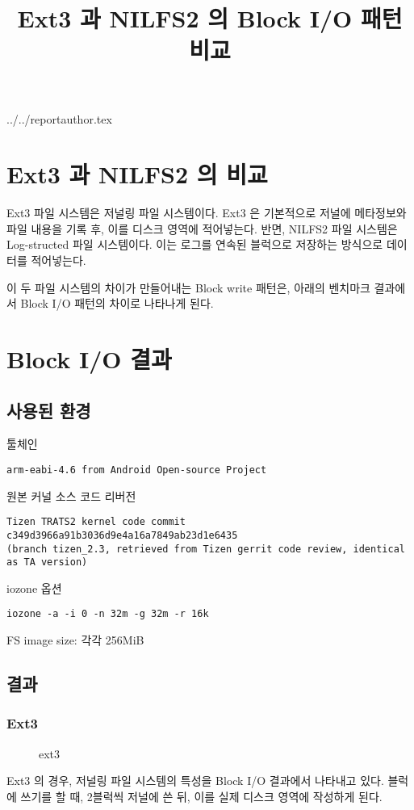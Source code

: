 \documentclass {article}
\begin{document}
\title {Ext3 과 NILFS2 의 Block I/O 패턴 비교}
 {../../reportauthor.tex}
\maketitle

\section{Ext3 과 NILFS2 의 비교}
Ext3 파일 시스템은 저널링 파일 시스템이다. Ext3 은 기본적으로 저널에 메타정보와 파일 내용을 기록 후, 이를 디스크 영역에 적어넣는다. 반면,
NILFS2 파일 시스템은 Log-structed 파일 시스템이다. 이는 로그를 연속된 블럭으로 저장하는 방식으로 데이터를 적어넣는다.

이 두 파일 시스템의 차이가 만들어내는 Block write 패턴은, 아래의 벤치마크 결과에서 Block I/O 패턴의 차이로 나타나게 된다.
\section{Block I/O 결과}
\subsection{사용된 환경}
\setlength{\parindent}{0cm}
툴체인
\begin{lstlisting}[style=customtxt]
  arm-eabi-4.6 from Android Open-source Project
\end{lstlisting}
원본 커널 소스 코드 리버전
\begin{lstlisting}[style=customtxt]
Tizen TRATS2 kernel code commit c349d3966a91b3036d9e4a16a7849ab23d1e6435
(branch tizen_2.3, retrieved from Tizen gerrit code review, identical as TA version)
\end{lstlisting}
iozone 옵션
\begin{lstlisting}[style=customtxt]
  iozone -a -i 0 -n 32m -g 32m -r 16k
\end{lstlisting}
FS image size: 각각 256MiB
\newpage
\subsection{결과}
\subsubsection{Ext3}
\begin{figure} [h!]
    \caption{ext3}
    \begin{center}
      \resizebox{0.5\textwidth}{!}{
        
      }
    \end{center}
\end{figure}
Ext3 의 경우, 저널링 파일 시스템의 특성을 Block I/O 결과에서 나타내고 있다. 블럭에 쓰기를 할 때, 2블럭씩 저널에 쓴 뒤, 이를 실제 디스크 영역에 작성하게 된다.
\end{document}

